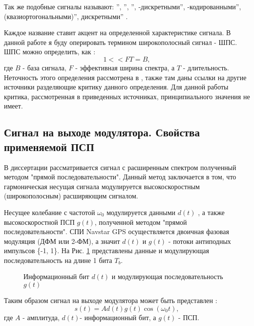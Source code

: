 Так же подобные сигналы называют:
\textquotedblright,
\textquotedblright,
\textquotedblright,
-дискретными\textquotedblright,
-кодированными\textquotedblright,
 (квазиортогональными)\textquotedblright,
 дискретными\textquotedblright
\cite{gantmaher-book}.

Каждое название ставит акцент на определенной характеристике сигнала. В данной работе я буду оперировать термином
широкополосный сигнал - ШПС. ШПС можно определить, как \cite{gantmaher-book, varakin-book}:
\begin{equation}
	\label{eq:ss_signal}
	1 << FT = B,
\end{equation}
где ${B}$ - база сигнала, ${F}$ - эффективная ширина спектра, а ${T}$ - длительность.
Неточность этого определения рассмотрена в \cite{gantmaher-book}, также там даны ссылки на другие источники
разделяющие критику данного определения. Для данной работы критика, рассмотренная в приведенных источниках,
принципиального значения не имеет.

\subsection{Сигнал на выходе модулятора. Свойства применяемой ПСП}
В диссертации рассматривается сигнал с расширенным спектром полученный методом "прямой последовательности".
Данный метод заключается в том, что гармоническая несущая сигнала модулируется высокоскоростным (широкополосным)
расширяющим сигналом. 

Несущее колебание с частотой ${\omega_0}$  модулируется данными ${d(t)}$ , а также высокоскоростной ПСП ${g(t)}$, полученной методом "прямой последовательности".
СПИ Navstar GPS осуществляется двоичная фазовая модуляция (ДФМ или 2-ФМ), а значит ${d(t)}$  и ${g(t)}$  - потоки антиподных импульсов \{-1, 1\}. На Рис. 
\ref{pic:bit_and_code} представлены данные и модулирующая последовательность на длине 1 бита ${T_b}$.
\begin{figure}[h]
	\center{}
	\caption{Информационный бит ${d(t)}$ и модулирующая последовательность ${g(t)}$ } 
	\label{pic:bit_and_code}
\end{figure}

Таким образом сигнал на выходе модулятора может быть представлен \cite{shahtarin_sync}:
\begin{equation}
	\label{eq:cdma_eq}
	s(t)=Ad(t)g(t)\cos{(\omega_{0}t)},
\end{equation}
где ${A}$ - амплитуда, ${d(t)}$- информационный бит, а ${g(t)}$ - ПСП.

